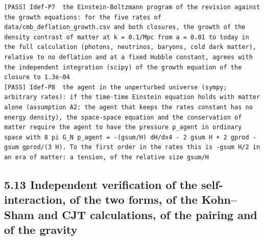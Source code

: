 \documentclass[
  10pt,
]{article}
\begin{document}
\begin{verbatim}
[PASS] Idef-P7  the Einstein-Boltzmann program of the revision against the growth equations: for the five rates of data/cmb_deflation_growth.csv and both closures, the growth of the density contrast of matter at k = 0.1/Mpc from a = 0.01 to today in the full calculation (photons, neutrinos, baryons, cold dark matter), relative to no deflation and at a fixed Hubble constant, agrees with the independent integration (scipy) of the growth equation of the closure to 1.3e-04
[PASS] Idef-P8  the agent in the unperturbed universe (sympy; arbitrary rates): if the time-time Einstein equation holds with matter alone (assumption A2: the agent that keeps the rates constant has no energy density), the space-space equation and the conservation of matter require the agent to have the pressure p_agent in ordinary space with 8 pi G_N p_agent = -(gsum/H) dH/dx4 - 2 gsum H + 2 gprod - gsum gprod/(3 H). To the first order in the rates this is -gsum H/2 in an era of matter: a tension, of the relative size gsum/H
\end{verbatim}

\hypertarget{independent-verification-of-the-self-interaction-of-the-two-forms-of-the-kohnsham-and-cjt-calculations-of-the-pairing-and-of-the-gravity}{%
\subsection{5.13 Independent verification of the self-interaction, of
the two forms, of the Kohn--Sham and CJT calculations, of the pairing
and of the
gravity}\label{independent-verification-of-the-self-interaction-of-the-two-forms-of-the-kohnsham-and-cjt-calculations-of-the-pairing-and-of-the-gravity}}
\end{document}

